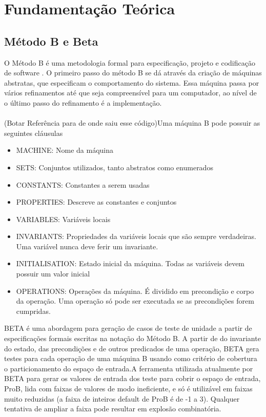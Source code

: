 \chapter{Fundamentação Teórica}\label{chp:LABEL_CHP_2}

\section{Método B e Beta}\label{sec:LABEL_CHP_2_SEC_A}
O Método B é uma metodologia formal para especificação, projeto e codificação
de software \cite{Abrial-1996}. O primeiro passo do método B se dá através da criação de máquinas abstratas, que especificam o comportamento do sistema. Essa máquina passa por vários refinamentos até que seja compreensível para um computador, ao nível de o último passo do refinamento é a implementação.\\
\\
(Botar Referência para de onde saiu esse código)Uma máquina B pode possuir as seguintes cláusulas
\begin{itemize}
	\item MACHINE: Nome da máquina
	\item SETS: Conjuntos utilizados, tanto abstratos como enumerados
	\item CONSTANTS: Constantes a serem usadas
	\item PROPERTIES: Descreve as constantes e conjuntos
	\item VARIABLES: Variáveis locais 
	\item INVARIANTS: Propriedades da variáveis locais que são sempre verdadeiras. Uma variável nunca deve ferir um invariante.
	\item INITIALISATION: Estado inicial da máquina. Todas as variáveis devem possuir um valor inicial
	\item OPERATIONS: Operações da máquina. É dividido em precondição e corpo da operação. Uma operação só pode ser executada se as precondições forem cumpridas.
\end{itemize}

BETA é uma abordagem para geração de casos de teste de unidade a partir
de especificações formais escritas na notação do Método B\cite{BETA-2015}. A partir de do invariante do estado, das precondições e de outros predicados de uma operação, BETA gera testes para cada operação de uma máquina B usando como critério de cobertura o particionamento do espaço de entrada.A ferramenta utilizada atualmente por BETA para gerar os valores de entrada dos teste para cobrir o espaço de entrada, ProB, lida com faixas de valores de modo ineficiente, e só é utilizável em faixas muito reduzidas (a faixa de inteiros default de ProB é de -1 a 3). Qualquer tentativa de ampliar a faixa pode resultar em explosão combinatória.


